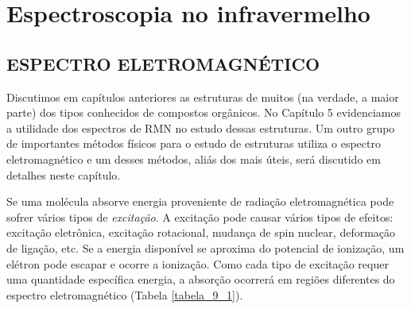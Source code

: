 \chapter{Espectroscopia no infravermelho}

\section{ESPECTRO ELETROMAGNÉTICO}

Discutimos em capítulos anteriores as estruturas de muitos (na verdade, a maior parte) dos tipos conhecidos de compostos orgânicos. No Capítulo 5 evidenciamos a utilidade dos espectros de RMN no estudo dessas estruturas. Um outro grupo de importantes métodos físicos para o estudo de estruturas utiliza o espectro eletromagnético e um desses métodos, aliás dos mais úteis, será discutido em detalhes neste capítulo. 

Se uma molécula absorve energia proveniente de radiação eletromagnética pode sofrer vários tipos de \textit{excitação}. A excitação pode causar vários tipos de efeitos: excitação eletrônica, excitação rotacional, mudança de spin nuclear, deformação de ligação, etc. Se a energia disponível se aproxima do potencial de ionização, um elétron pode escapar e ocorre a ionização. Como cada tipo de excitação requer uma quantidade específica energia, a absorção ocorrerá em regiões diferentes do espectro eletromagnético (Tabela \ref{tabela_9_1}).

